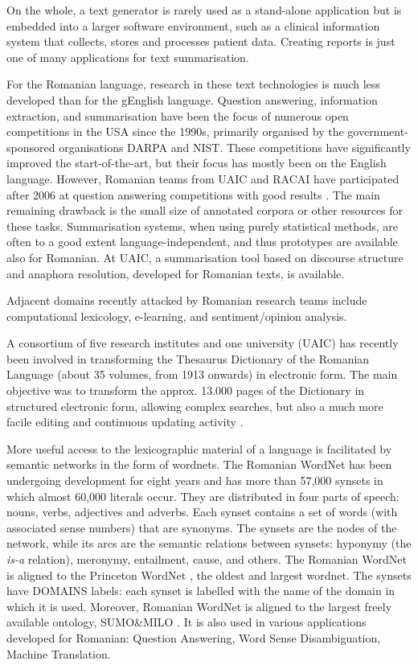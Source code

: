 \begin{multicols}{2}
On the whole, a text generator is rarely used as a stand-alone application but is embedded into a larger software environment, such as a clinical information system that collects, stores and processes patient data. Creating reports is just one of many applications for text summarisation. 


For the Romanian language, research in these text technologies is much less developed than for the gEnglish language. Question answering, information extraction, and summarisation have been the focus of numerous open competitions in the USA since the 1990s, primarily organised by the government-sponsored organisations DARPA and NIST. These competitions have significantly improved the start-of-the-art, but their focus has mostly been on the English language. However, Romanian teams from UAIC and RACAI have participated after 2006 at question answering competitions with good results \cite{qa}. The main remaining drawback is the small size of annotated corpora or other resources for these tasks. Summarisation systems, when using purely statistical methods, are often to a good extent language-independent, and thus prototypes are available also for Romanian. At UAIC, a summarisation tool based on discourse structure and anaphora resolution, developed for Romanian texts, is available.

Adjacent domains recently attacked by Romanian research teams include computational lexicology, e-learning, and sentiment/opinion analysis. 

A consortium of five research institutes and one university (UAIC) has recently been involved in transforming the Thesaurus Dictionary of the Romanian Language (about 35 volumes, from 1913 onwards) in electronic form. The main objective was to transform the approx. 13.000 pages of the Dictionary in structured electronic form, allowing complex searches, but also a much more facile editing and continuous updating activity \cite{cristea3}.

More useful access to the lexicographic material of a language is facilitated by semantic networks in the form of wordnets. The Romanian WordNet has been undergoing development for eight years and has more than 57,000 synsets in which almost 60,000 literals occur. They are distributed in four parts of speech: nouns, verbs, adjectives and adverbs. Each synset contains a set of words (with associated sense numbers) that are synonyms. The synsets are the nodes of the network, while its arcs are the semantic relations between synsets: hyponymy (the \textit{is-a} relation), meronymy, entailment, cause, and others. The Romanian WordNet is aligned to the Princeton WordNet \cite{wnURL}, the oldest and largest wordnet. The synsets have DOMAINS labels: each synset is labelled with the name of the domain in which it is used. Moreover, Romanian WordNet is aligned to the largest freely available ontology, SUMO\&MILO \cite{ro_wnURL}. It is also used in various applications developed for Romanian: Question Answering, Word Sense Disambiguation, Machine Translation.


\end{multicols}
